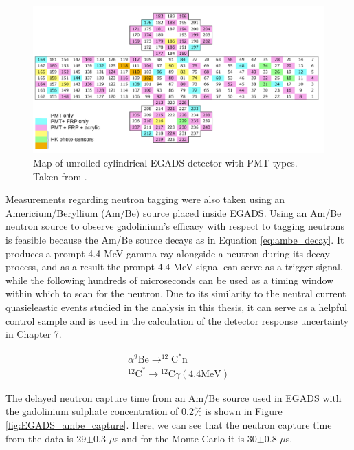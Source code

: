 \begin{figure}[H]
    \includegraphics[width=\textwidth]{Figures/egads_pmt_map.png}
\caption{Map of unrolled cylindrical EGADS detector with PMT types. Taken from \cite{marti_evaluation_2020}.}
\label{fig:EGADS_PMT}
\end{figure}

Measurements regarding neutron tagging were also taken using an Americium/Beryllium (Am/Be) source placed inside EGADS. Using an Am/Be neutron source to observe gadolinium's efficacy with respect to tagging neutrons is feasible because the Am/Be source decays as in Equation \ref{eq:ambe_decay}. It produces a prompt 4.4 MeV gamma ray alongside a neutron during its decay process, and as a result the prompt 4.4 MeV signal can serve as a trigger signal, while the following hundreds of microseconds can be used as a timing window within which to scan for the neutron. Due to its similarity to the neutral current quasieleastic events studied in the analysis in this thesis, it can serve as a helpful control sample and is used in the calculation of the detector response uncertainty in Chapter 7.

\begin{equation}
\begin{array}{c}
\alpha^{9} \mathrm{Be} \longrightarrow^{12} \mathrm{C}^{*} \mathrm{n} \\
{ }^{12} \mathrm{C}^{*} \longrightarrow{ }^{12} \mathrm{C} \gamma(4.4 \mathrm{MeV})
\end{array}
\label{eq:ambe_decay}
\end{equation}

The delayed neutron capture time from an Am/Be source used in EGADS with the gadolinium sulphate concentration of 0.2\% is shown in Figure \ref{fig:EGADS_ambe_capture}. Here, we can see that the neutron capture time from the data is 29$\pm$0.3 $\mu$s and for the Monte Carlo it is 30$\pm$0.8 $\mu$s.

